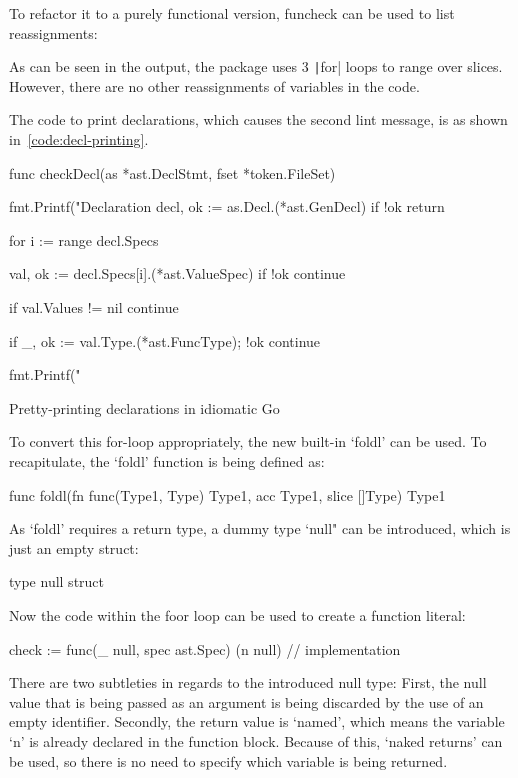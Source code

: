 To refactor it to a purely functional version, funcheck can be used to
list reassignments:

As can be seen in the output, the package uses 3 \texttt|for| loops to range over
slices. However, there are no other reassignments of variables in the code.

The code to print declarations, which causes the second lint message, is as shown in~\ref{code:decl-printing}.

\begin{code}
\begin{gocode}
func checkDecl(as *ast.DeclStmt, fset *token.FileSet) {
	fmt.Printf("Declaration %
	decl, ok := as.Decl.(*ast.GenDecl)
	if !ok {
		return
	}

	for i := range decl.Specs {
		val, ok := decl.Specs[i].(*ast.ValueSpec)
		if !ok {
			continue
		}

		if val.Values != nil {
			continue
		}

		if _, ok := val.Type.(*ast.FuncType); !ok {
			continue
		}

		fmt.Printf("\tIdent %
	}
}
\end{gocode}
	\caption{Pretty-printing declarations in idiomatic Go\label{code:decl-printing}}
\end{code}
To convert this for-loop appropriately, the new built-in `foldl' can be used.
To recapitulate, the `foldl' function is being defined as:
\begin{gocode}
func foldl(fn func(Type1, Type) Type1, acc Type1, slice []Type) Type1
\end{gocode}
As `foldl' requires a return type, a dummy type `null" can be introduced, which
is just an empty struct:
\begin{gocode}
type null struct{}
\end{gocode}
Now the code within the foor loop can be used to create a function literal:
\begin{gocode}
check := func(_ null, spec ast.Spec) (n null) {
	// implementation
}
\end{gocode}
There are two subtleties in regards to the introduced null type:
First, the null value that is being passed as an argument is being discarded
by the use of an empty identifier.
Secondly, the return value is `named', which means the variable `n' is
already declared in the function block. Because of this, `naked returns' can
be used, so there is no need to specify which variable is being returned.

